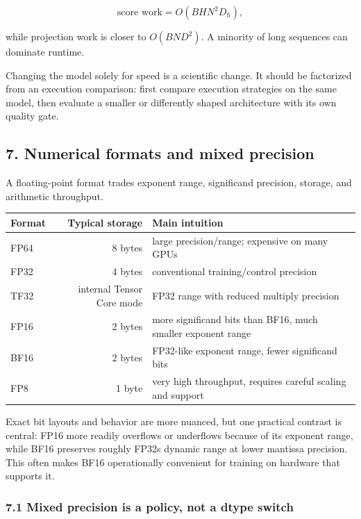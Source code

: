 \documentclass[
  10pt,
  letterpaper,
]{article}
\newcounter{none} %
\begin{document}
\[
\text{score work}=O(BHN^2D_h),
\]

while projection work is closer to \(O(BND^2)\). A minority of long
sequences can dominate runtime.

Changing the model solely for speed is a scientific change. It should be
factorized from an execution comparison: first compare execution
strategies on the same model, then evaluate a smaller or differently
shaped architecture with its own quality gate.

\subsection{7. Numerical formats and mixed
precision}\label{7-numerical-formats-and-mixed-precision}

A floating-point format trades exponent range, significand precision,
storage, and arithmetic throughput.

{\def\LTcaptype{none} %
\begin{longtable}[]{@{}lrl@{}}
\toprule\noalign{}
Format & Typical storage & Main intuition \\
\midrule\noalign{}
\endhead
\bottomrule\noalign{}
\endlastfoot
FP64 & 8 bytes & large precision/range; expensive on many GPUs \\
FP32 & 4 bytes & conventional training/control precision \\
TF32 & internal Tensor Core mode & FP32 range with reduced multiply
precision \\
FP16 & 2 bytes & more significand bits than BF16, much smaller exponent
range \\
BF16 & 2 bytes & FP32-like exponent range, fewer significand bits \\
FP8 & 1 byte & very high throughput, requires careful scaling and
support \\
\end{longtable}
}

Exact bit layouts and behavior are more nuanced, but one practical
contrast is central: FP16 more readily overflows or underflows because
of its exponent range, while BF16 preserves roughly
FP32\textquotesingle s dynamic range at lower mantissa precision. This
often makes BF16 operationally convenient for training on hardware that
supports it.

\subsubsection{7.1 Mixed precision is a policy, not a dtype
switch}\label{71-mixed-precision-is-a-policy-not-a-dtype-switch}
\end{document}
